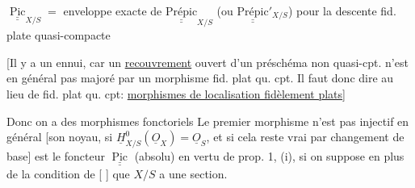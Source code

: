 
$\underline{\underline{\operatorname{Pic}}}_{X/S}=$ enveloppe exacte de $\underline{\underline{\mathrm{Prépic}}}_{X/S}$ (ou $\underline{\underline{\mathrm{Prépic}}}'_{X/S}$) pour la descente fid. plate quasi-compacte

[Il y a un ennui, car un \uline{recouvrement} ouvert d'un préschéma non quasi-cpt. n'est en général pas majoré par un morphisme fid. plat qu. cpt. Il faut donc dire au lieu de fid. plat qu. cpt:   \uline{morphismes de localisation fidèlement plats}]

Donc on a des morphismes fonctoriels
Le premier morphisme n'est pas injectif en général [son noyau, si $\underline H^0_{X/S}(\underline O_X)=\underline O_S$, et si cela reste vrai par changement de base] est le foncteur $\underline{\underline{\operatorname{Pic}}}$ (absolu) en vertu de prop. 1, (i),  si on suppose en plus de la condition de [ ] que $X/S$ a une section. 

